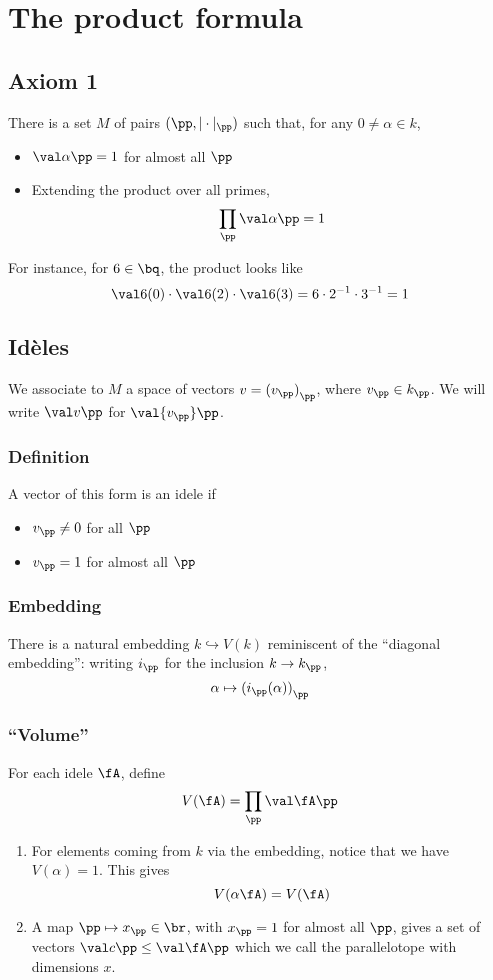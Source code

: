 \section{The product formula}
\label{sec:orgheadline26}
\subsection{Axiom 1}
\label{sec:orgheadline7}
There is a set \(M\) of pairs \((\pp, |\cdot|_\pp)\) such that, for any \(0\neq \alpha \in k\),
\begin{itemize}
\item \(\val\alpha\pp = 1\) for almost all \(\pp\)
\item Extending the product over all primes, 
\[ \prod_\pp \val\alpha\pp = 1 \]
\end{itemize}
For instance, for \(6\in\bq\), the product looks like
\[ \val6{(0)} \cdot\val6{(2)}\cdot\val6{(3)} = 6\cdot 2^{-1} \cdot 3^{-1} = 1 \]
\subsection{Idèles}
\label{sec:orgheadline19}
We associate to \(M\) a space of vectors \(v={ (v_\pp) }_\pp\), where \(v_\pp \in k_\pp\). We will write \(\val v\pp\) for \(\val{v_\pp}\pp\).
\subsubsection{Definition}
\label{sec:orgheadline8}
A vector of this form is an idele if 
\begin{itemize}
\item \(v_\pp\neq 0\) for all \(\pp\)
\item \(v_\pp = 1\) for almost all \(\pp\)
\end{itemize}
\subsubsection{Embedding}
\label{sec:orgheadline9}
There is a natural embedding \(k\hookrightarrow V(k)\) reminiscent of the ``diagonal embedding'': writing \(i_\pp\) for the inclusion \(k\to k_\pp\),
\[\alpha\mapsto{ (i_\pp(\alpha)) }_\pp\]
\subsubsection{``Volume''}
\label{sec:orgheadline12}
For each idele \(\fA\), define
\[V(\fA) = \prod_\pp \val\fA\pp \]
\begin{enumerate}
\item For elements coming from \(k\) via the embedding, notice that we have \(V(\alpha) = 1\). This gives
\label{sec:orgheadline10}
\[V(\alpha\fA) = V(\fA)\]
\item A map \(\pp\mapsto x_\pp \in\br\), with \(x_\pp = 1\) for almost all \(\pp\), gives a set of vectors \(\val c\pp \leq \val\fA\pp\) which we call the parallelotope with dimensions \(x\).
\label{sec:orgheadline11}
\end{enumerate}
